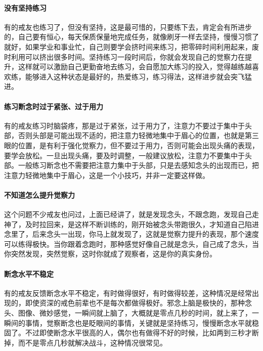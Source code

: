 \paragraph{没有坚持练习}

有的戒友也练习了，但没有坚持，这是最可惜的，只要练下去，肯定会有所进步的，自己要有恒心，每天保质保量地完成任务，就像刷牙一样去坚持，慢慢习惯了就好，如果学业和事业忙，自己则要学会挤时间来练习，把零碎时间利用起来，废时利用可以挤出很多时间。坚持练习一段时间后，你就会发现自己的觉察力在提升，这样就可以激励自己更勤奋地去练习，会自愿加大练习的投入，觉得越练越喜欢练，能够进入这种状态是最好的，热爱练习，练习得法，这样进步就会突飞猛进。

\paragraph{练习断念时过于紧张、过于用力}

有的戒友练习时脑袋疼，那是过于紧张，过于用力了，注意力不要过于集中于头部，否则头部是可能出现不适的，把注意力轻微地集中于眉心的位置，也就是第三眼的位置，是有利于强化觉察力，但不要过于用力，否则可能会出现头痛的表现，要学会放松。一旦出现头痛，要及时调整，一般建议放松，注意力不要集中于头部。一般练习断念也不需要把注意力集中于头部，只是去感知念头的出现而已，把注意力轻微地集中于眉心，这是一个小技巧，并非一定要这样做。

\paragraph{不知道怎么提升觉察力}

这个问题不少戒友也问过，上面已经讲了，就是发现念头，不跟念跑，发现自己走神了，及时拉回来，是这样不断训练的，刚开始被念头带跑很久，才知道自己陷进念里了，后来念头一出现，你马上就发现了，这就是觉察力提升的表现，那个速度可以练得极快。当你跟着念跑时，那种感觉好像自己就是念头，自己成了念头，当你突然发现，突然觉察，这时你就成了观察者，这是你的真实身份。

\paragraph{断念水平不稳定}

有的戒友反馈断念水平不稳定，有时做得很好，有时做得较差，这种情况是经常出现的，即使资深的戒色前辈也不是每次都做得极好。邪念上脑是极快的，那种念头、图像、微妙感觉，一瞬间就上脑了，大概就是零点几秒的时间，就上来了，一瞬间的事情，觉察断念也是眨眼间的事情，关键就是坚持练习，慢慢断念水平就稳固了。不过即使断念水平很高的人，偶尔也有做得不好的时候，比如两到三秒才断掉，而不是零点几秒就解决战斗，这种情况很常见。

